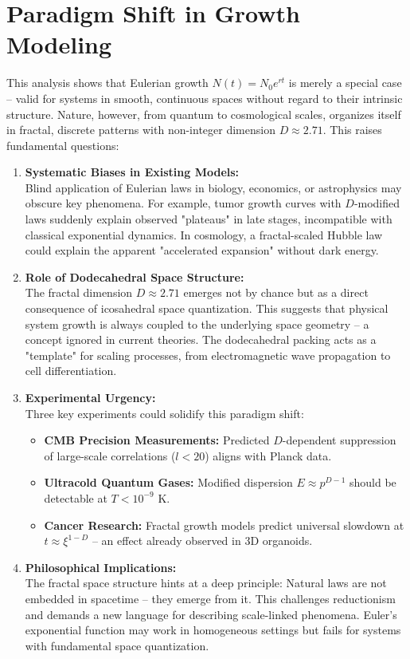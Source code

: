 \section{Paradigm Shift in Growth Modeling}  
This analysis shows that Eulerian growth $N(t)=N_0e^{rt}$ is merely a special case – valid for systems in smooth, continuous spaces  
without regard to their intrinsic structure. Nature, however, from quantum to cosmological scales, organizes itself in fractal, discrete patterns with  
non-integer dimension $D \approx 2.71$. This raises fundamental questions:  
\begin{enumerate}  
    \item \textbf{Systematic Biases in Existing Models:}\\Blind application of Eulerian laws in biology, economics, or astrophysics may obscure key phenomena. For example, tumor growth curves with $D$-modified laws suddenly explain observed "plateaus" in late stages, incompatible with classical exponential dynamics. In cosmology, a fractal-scaled Hubble law could explain the apparent "accelerated expansion" without dark energy.  
    \item \textbf{Role of Dodecahedral Space Structure:}\\The fractal dimension $D\approx2.71$ emerges not by chance but as a direct consequence of icosahedral space quantization. This suggests that physical system growth is always coupled to the underlying space geometry – a concept ignored in current theories. The dodecahedral packing acts as a "template" for scaling processes, from electromagnetic wave propagation to cell differentiation.  
    \item \textbf{Experimental Urgency:}\\Three key experiments could solidify this paradigm shift:  
    \begin{itemize}  
        \item \textbf{CMB Precision Measurements:} Predicted $D$-dependent suppression of large-scale correlations ($l < 20$) aligns with Planck data.  
        \item \textbf{Ultracold Quantum Gases:} Modified dispersion $E \approx p^{D-1}$ should be detectable at $T < 10^{-9}$ K.  
        \item \textbf{Cancer Research:} Fractal growth models predict universal slowdown at $t \approx \xi^{1-D}$ – an effect already observed in 3D organoids.  
    \end{itemize}  
    \item \textbf{Philosophical Implications:}\\The fractal space structure hints at a deep principle: Natural laws are not embedded in spacetime – they emerge from it. This challenges reductionism and demands a new language for describing scale-linked phenomena. Euler's exponential function may work in homogeneous settings but fails for systems with fundamental space quantization.  

\end{enumerate}
